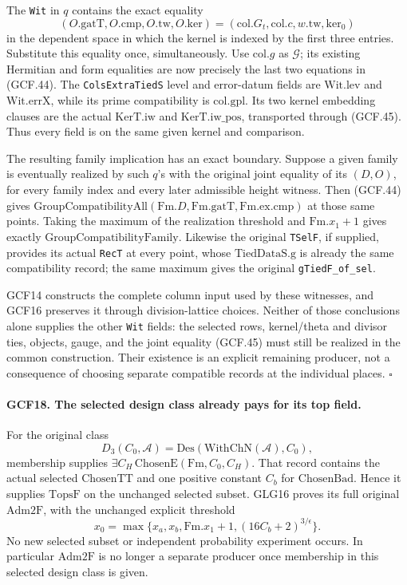 The \texttt{Wit} in \(q\) contains the exact equality
\[
 (O.\mathrm{gatT},O.\mathrm{cmp},O.\mathrm{tw},O.\mathrm{ker})
       =(\mathrm{col}.G_t,\mathrm{col}.c,w.\mathrm{tw},\mathrm{ker}_0)
 \tag{GCF.45}
\]
in the dependent space in which the kernel is indexed by the first
three entries.  Substitute this equality once, simultaneously.  Use
\(\mathrm{col}.g\) as \(\mathcal G\); its existing Hermitian and
form equalities are now precisely the last two equations in
(GCF.44).  The \texttt{ColsExtraTiedS} level and error-datum fields
are \(\mathrm{Wit.lev}\) and \(\mathrm{Wit.errX}\), while its
prime compatibility is \(\mathrm{col.gpl}\).  Its two kernel
embedding clauses are the actual \(\mathrm{KerT.iw}\) and
\(\mathrm{KerT.iw\_pos}\), transported through (GCF.45).
Thus every field is on the same given kernel and comparison.

The resulting family implication has an exact boundary.  Suppose a
given family is eventually realized by such \(q\)'s with the
original joint equality of its \((D,O)\), for every family index
and every later admissible height witness.  Then (GCF.44) gives
\(\mathrm{GroupCompatibilityAll}(\mathrm{Fm}.D,
\mathrm{Fm}.\mathrm{gatT},\mathrm{Fm}.\mathrm{ex.cmp})\) at
those same points.  Taking the maximum of the realization threshold
and \(\mathrm{Fm}.x_1+1\) gives exactly
\(\mathrm{GroupCompatibilityFamily}\).  Likewise the original
\texttt{TSelF}, if supplied, provides its actual \texttt{RecT}
at every point, whose \(\mathrm{TiedDataS.g}\) is already the
same compatibility record; the same maximum gives the original
\texttt{gTiedF\_of\_sel}.

GCF14 constructs the complete column input used by these witnesses,
and GCF16 preserves it through division-lattice choices.  Neither
of those conclusions alone supplies the other \texttt{Wit} fields:
the selected rows, kernel/theta and divisor ties, objects, gauge,
and the joint equality (GCF.45) must still be realized in the common
construction.  Their existence is an explicit remaining producer,
not a consequence of choosing separate compatible records at the
individual places.
\hfill\(\square\)

\paragraph{GCF18. The selected design class already pays for its top field.}
\label{claim:GCF18}
For the original class
\[
 D_3(C_0,\mathcal A)=\mathrm{Des}(\mathrm{WithChN}(\mathcal A),C_0),
\]
membership supplies \(\exists C_H\,\mathrm{ChosenE}(\mathrm{Fm},C_0,C_H)\).
That record contains the actual selected \(\mathrm{ChosenTT}\)
and one positive constant \(C_b\) for \(\mathrm{ChosenBad}\).
Hence it supplies \(\mathrm{TopsF}\) on the unchanged selected
subset.  GLG16 proves its full original \(\mathrm{Adm2F}\), with
the unchanged explicit threshold
\[
 x_0=\max\{x_a,x_b,\mathrm{Fm}.x_1+1,
                              (16C_b+2)^{3/\epsilon}\}.
 \tag{GCF.46}
\]
No new selected subset or independent probability experiment occurs.
In particular \(\mathrm{Adm2F}\) is no longer a separate producer
once membership in this selected design class is given.

